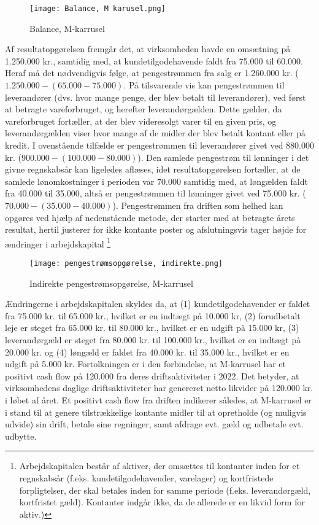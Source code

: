 \documentclass[10pt,reqno, usenames]{article}
\begin{document}
\begin{figure}[h]
     \centering
     \texttt{[image: Balance, M karusel.png]}
     \caption{Balance, M-karrusel}
     \label{Figur 1}
\end{figure}

Af resultatopgørelsen fremgår det, at virksomheden havde en omsætning på 1.250.000 kr., samtidig med, at kundetilgodehavende faldt fra 75.000 til 60.000. Heraf må det nødvendigvis følge, at pengestrømmen fra salg er 1.260.000 kr. ($1.250.000 - (65.000 - 75.000)$. På tilsvarende vis kan pengestrømmen til leverandører (dvs. hvor mange penge, der blev betalt til leverandører), ved først at betragte vareforbruget, og herefter leverandørgælden. Dette gælder, da vareforbruget fortæller, at der blev videresolgt varer til en given pris, og leverandørgælden viser hvor mange af de midler der blev betalt kontant eller på kredit. I ovenstående tilfælde er pengestrømmen til leverandører givet ved 880.000 kr. ($900.000 - (100.000 - 80.000)$). Den samlede pengestrøm til lønninger i det givne regnskabsår kan ligeledes aflæses, idet resultatopgørelsen fortæller, at de samlede lønomkostninger i perioden var 70.000 samtidig med, at løngælden faldt fra 40.000 til 35.000, altså er pengestrømmen til lønninger givet ved 75.000 kr. ($70.000 - (35.000 - 40.000)$). Pengestrømmen fra driften som helhed kan opgøres ved hjælp af nedenstående metode, der starter med at betragte årets resultat, hertil justerer for ikke kontante poster og afslutningsvis tager højde for ændringer i arbejdskapital \footnote{Arbejdskapitalen består af aktiver, der omsættes til kontanter inden for et regnskabsår (f.eks. kundetilgodehavender, varelager) og kortfristede forpligtelser, der skal betales inden for samme periode (f.eks. leverandørgæld, kortfristet gæld). Kontanter indgår ikke, da de allerede er en likvid form for aktiv.)}

\begin{figure}[h]
     \centering
     \texttt{[image: pengestrømsopgørelse, indirekte.png]}
     \caption{Indirekte pengestrømsopgørelse, M-karrusel}
     \label{Figur 1}
\end{figure}
Ændringerne i arbejdskapitalen skyldes da, at (1) kundetilgodehavender er faldet fra 75.000 kr. til 65.000 kr., hvilket er en indtægt på 10.000 kr, (2) forudbetalt leje er steget fra 65.000 kr. til 80.000 kr., hvilket er en udgift på 15.000 kr, (3) leverandørgæld er steget fra 80.000 kr. til 100.000 kr., hvilket er en indtægt på 20.000 kr. og (4) løngæld er faldet fra 40.000 kr. til 35.000 kr., hvilket er en udgift på 5.000 kr. Fortolkningen er i den forbindelse, at M-karrusel har et positivt cash flow på 120.000 fra deres driftsaktiviteter i 2022. Det betyder, at virksomhedens daglige driftsaktiviteter har genereret netto likvider på 120.000 kr. i løbet af året. Et positivt cash flow fra driften indikerer således, at M-karrusel er i stand til at genere tilstrækkelige kontante midler til at opretholde (og muligvis udvide) sin drift, betale sine regninger, samt afdrage evt. gæld og udbetale evt. udbytte.
\end{document}
